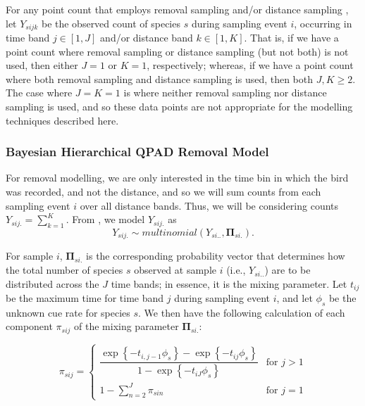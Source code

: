 \documentclass[12pt]{article}
\begin{document}
\par For any point count that employs removal sampling \citep{alldredge_time--detection_2007, farnsworth_removal_2002} and/or distance sampling \citep{buckland_introduction_2001, buckland_distance_2015}, let $Y_{sijk}$ be the observed count of species $s$ during sampling event $i$, occurring in time band $j \in [1,J]$ and/or distance band $k \in [1,K]$.
That is, if we have a point count where removal sampling or distance sampling (but not both) is not used, then either $J = 1$ or $K = 1$, respectively; whereas, if we have a point count where both removal sampling and distance sampling is used, then both $J,K \geq 2$.
The case where $J = K = 1$ is where neither removal sampling nor distance sampling is used, and so these data points are not appropriate for the modelling techniques described here.

\subsubsection{Bayesian Hierarchical QPAD Removal Model}

\par For removal modelling, we are only interested in the time bin in which the bird was recorded, and not the distance, and so we will sum counts from each sampling event $i$ over all distance bands. 
Thus, we will be considering counts $Y_{sij.} = \sum_{k=1}^{K}$. 
From \citet{solymos_calibrating_2013}, we model $Y_{sij.}$ as
$$Y_{sij.} \sim multinomial\left(Y_{si..}, \mathbf{\Pi}_{si.}\right).$$

\par For sample $i$, $\mathbf{\Pi}_{si.}$ is the corresponding probability vector that determines how the total number of species $s$ observed at sample $i$ (i.e., $Y_{si..}$) are to be distributed across the $J$ time bands; in essence, it is the mixing parameter.
Let $t_{ij}$ be the maximum time for time band $j$ during sampling event $i$, and let $\phi_s$ be the unknown cue rate for species $s$.
We then have the following calculation of each component $\pi_{sij}$ of the mixing parameter $\mathbf{\Pi}_{si.}$:

\begin{equation*}
	\pi_{sij} = 
	\begin{cases}
		\dfrac{\exp\left\{ -t_{i,j-1}\phi_{s} \right\} - \exp\left\{ -t_{ij}\phi_{s} \right\}}{1 - \exp\left\{ -t_{iJ}\phi_{s} \right\}} & \text{for } j > 1 \\
		1 - \sum_{n = 2}^{J} \pi_{sin} & \text{for } j = 1
	\end{cases}
\end{equation*}
\end{document}
